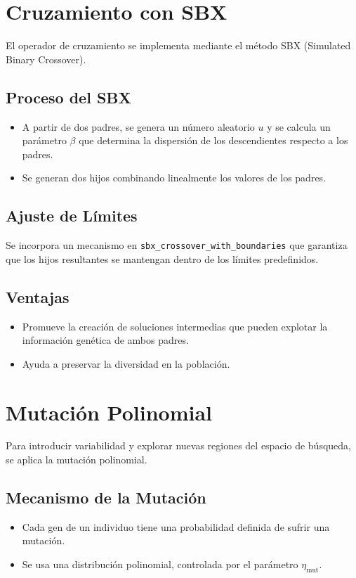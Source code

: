 \section{Cruzamiento con SBX}

El operador de cruzamiento se implementa mediante el m\'etodo SBX (Simulated Binary Crossover).

\subsection*{Proceso del SBX}
\begin{itemize}
    \item A partir de dos padres, se genera un n\'umero aleatorio $u$ y se calcula un par\'ametro $\beta$ que determina la dispersi\'on de los descendientes respecto a los padres.
    \item Se generan dos hijos combinando linealmente los valores de los padres.
\end{itemize}

\subsection*{Ajuste de L\'imites}
Se incorpora un mecanismo en \texttt{sbx\_crossover\_with\_boundaries} que garantiza que los hijos resultantes se mantengan dentro de los l\'imites predefinidos.

\subsection*{Ventajas}
\begin{itemize}
    \item Promueve la creaci\'on de soluciones intermedias que pueden explotar la informaci\'on gen\'etica de ambos padres.
    \item Ayuda a preservar la diversidad en la poblaci\'on.
\end{itemize}

\section{Mutaci\'on Polinomial}

Para introducir variabilidad y explorar nuevas regiones del espacio de b\'usqueda, se aplica la mutaci\'on polinomial.

\subsection*{Mecanismo de la Mutaci\'on}
\begin{itemize}
    \item Cada gen de un individuo tiene una probabilidad definida de sufrir una mutaci\'on.
    \item Se usa una distribuci\'on polinomial, controlada por el par\'ametro $\eta_{\text{mut}}$.
\end{itemize}

